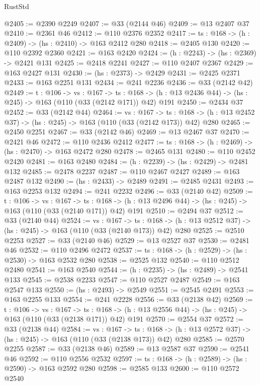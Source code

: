 \begin{lexlean}{RustStd}
\begin{coremodule}
@2405 := @2390 @2249
@2407 := @33 (@2144 @46)
@2409 := @13 @2407 @37
@2410 := @2361 @46
@2412 := @110 @2376 @2352
@2417 := {ts : @168} -> (h : @2409) -> (hs : @2410) -> @163 @2412 @280
@2418 := @2405 @130
@2420 := @110 @2392 @2360
@2421 := @163 @2420
@2424 := (h : @2243) -> (hs : @2369) -> @2421 @131
@2425 := @2418 @2241
@2427 := @110 @2407 @2367
@2429 := @163 @2427 @131
@2430 := (hs : @2373) -> @2429
@2431 := @2425 @2371
@2433 := @163 @2251 @131
@2434 := @241 @2236
@2436 := @33 (@2142 @42)
@2449 := {t : @106} ->
  {vs : @167} ->
  {ts : @168} -> (h : @13 @2436 @44) -> (hs : @245) -> @163 (@110 (@33 (@2142 @171)) @42) @191
@2450 := @2434 @37
@2452 := @33 (@2142 @44)
@2464 := {vs : @167} ->
  {ts : @168} -> (h : @13 @2452 @37) -> (hs : @245) -> @163 (@110 (@33 (@2142 @173)) @42) @280
@2465 := @2450 @2251
@2467 := @33 (@2142 @46)
@2469 := @13 @2467 @37
@2470 := @2421 @46
@2472 := @110 @2436 @2412
@2477 := {ts : @168} -> (h : @2469) -> (hs : @2470) -> @163 @2472 @280
@2478 := @2465 @131
@2480 := @110 @2452 @2420
@2481 := @163 @2480
@2484 := (h : @2239) -> (hs : @2429) -> @2481 @132
@2485 := @2478 @2237
@2487 := @110 @2467 @2427
@2489 := @163 @2487 @132
@2490 := (hs : @2433) -> @2489
@2491 := @2485 @2431
@2493 := @163 @2253 @132
@2494 := @241 @2232
@2496 := @33 (@2140 @42)
@2509 := {t : @106} ->
  {vs : @167} ->
  {ts : @168} -> (h : @13 @2496 @44) -> (hs : @245) -> @163 (@110 (@33 (@2140 @171)) @42) @191
@2510 := @2494 @37
@2512 := @33 (@2140 @44)
@2524 := {vs : @167} ->
  {ts : @168} -> (h : @13 @2512 @37) -> (hs : @245) -> @163 (@110 (@33 (@2140 @173)) @42) @280
@2525 := @2510 @2253
@2527 := @33 (@2140 @46)
@2529 := @13 @2527 @37
@2530 := @2481 @46
@2532 := @110 @2496 @2472
@2537 := {ts : @168} -> (h : @2529) -> (hs : @2530) -> @163 @2532 @280
@2538 := @2525 @132
@2540 := @110 @2512 @2480
@2541 := @163 @2540
@2544 := (h : @2235) -> (hs : @2489) -> @2541 @133
@2545 := @2538 @2233
@2547 := @110 @2527 @2487
@2549 := @163 @2547 @133
@2550 := (hs : @2493) -> @2549
@2551 := @2545 @2491
@2553 := @163 @2255 @133
@2554 := @241 @2228
@2556 := @33 (@2138 @42)
@2569 := {t : @106} ->
  {vs : @167} ->
  {ts : @168} -> (h : @13 @2556 @44) -> (hs : @245) -> @163 (@110 (@33 (@2138 @171)) @42) @191
@2570 := @2554 @37
@2572 := @33 (@2138 @44)
@2584 := {vs : @167} ->
  {ts : @168} -> (h : @13 @2572 @37) -> (hs : @245) -> @163 (@110 (@33 (@2138 @173)) @42) @280
@2585 := @2570 @2255
@2587 := @33 (@2138 @46)
@2589 := @13 @2587 @37
@2590 := @2541 @46
@2592 := @110 @2556 @2532
@2597 := {ts : @168} -> (h : @2589) -> (hs : @2590) -> @163 @2592 @280
@2598 := @2585 @133
@2600 := @110 @2572 @2540

\end{coremodule}
\end{lexlean}
